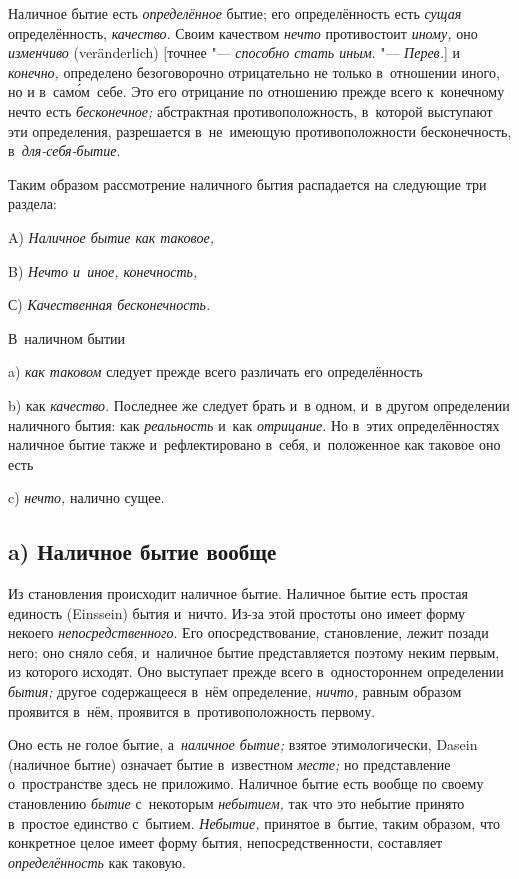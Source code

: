 Наличное бытие есть {\em определённое} бытие; его определённость есть
{\em сущая} определённость, {\em качество}. Своим качеством {\em нечто}
противостоит {\em иному,} оно {\em изменчиво} (ver\-änder\-lich)
[точнее "--- {\em способно стать иным}. "--- {\em Перев.}] и {\em конечно,}
определено безоговорочно отрицательно не только в~отношении иного, но и
в~сам\'{о}м~себе. Это его отрицание по отношению прежде всего к~конечному нечто
есть {\em бесконечное;} абстрактная противоположность, в~которой выступают эти
определения, разрешается в~не~имеющую противоположности бесконечность,
в~{\em для-себя-бытие}.

Таким образом рассмотрение наличного бытия
распадается на следующие три раздела:

A) {\em Наличное бытие как таковое,}

B) {\em Нечто и~иное, конечность,}

С) {\em Качественная бесконечность.}


В~наличном бытии

a) {\em как таковом} следует прежде всего различать его определённость

b) как {\em качество}. Последнее же следует брать и~в одном, и~в другом
определении наличного бытия: как {\em реальность} и~как {\em отрицание}.
Но в~этих определённостях наличное бытие также и~рефлектировано в~себя,
и~положенное как таковое оно есть

c) {\em нечто,} налично сущее.

\subsection[a) Наличное бытие вообще]{a) Наличное бытие вообще}

Из становления происходит наличное бытие. Наличное бытие есть простая единость
(Eins\-sein) бытия и~ничто. Из-за этой простоты оно имеет форму некоего
{\em непосредственного}. Его опосредствование, становление, лежит позади него;
оно сняло себя, и~наличное бытие представляется поэтому неким первым, из
которого исходят. Оно выступает прежде всего в~одностороннем определении
{\em бытия;} другое содержащееся в~нём определение, {\em ничто,} равным
образом проявится в~нём, проявится в~противоположность первому.

Оно есть не голое бытие, а~{\em наличное бытие;} взятое этимологически, Dasein
(наличное бытие) означает бытие в~известном {\em месте;} но представление
о~пространстве здесь не приложимо. Наличное бытие есть вообще по своему
становлению {\em бытие} с~некоторым {\em небытием,} так что это небытие принято
в~простое единство с~бытием. {\em Небытие,} принятое в~бытие, таким образом,
что конкретное целое имеет форму бытия, непосредственности, составляет
{\em определённость} как таковую.

